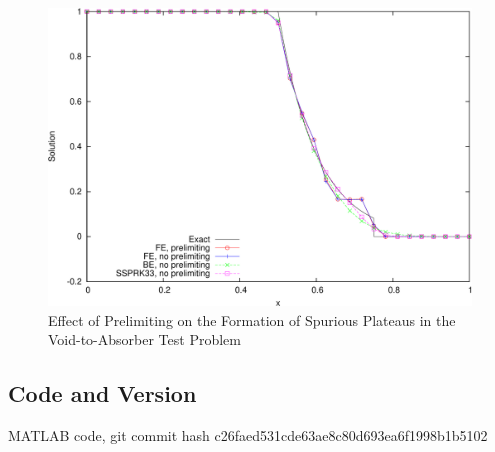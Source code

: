 \begin{figure}[ht]
   \centering
   \includegraphics[width=\textwidth]{prelimiting_void_to_absorber/prelimiting.pdf}
   \caption{Effect of Prelimiting on the Formation of Spurious Plateaus
      in the Void-to-Absorber Test Problem}
   \label{fig:prelimiting_void_to_absorber}
\end{figure}
\subsection{Code and Version}
MATLAB code, git commit hash c26faed531cde63ae8c80d693ea6f1998b1b5102
